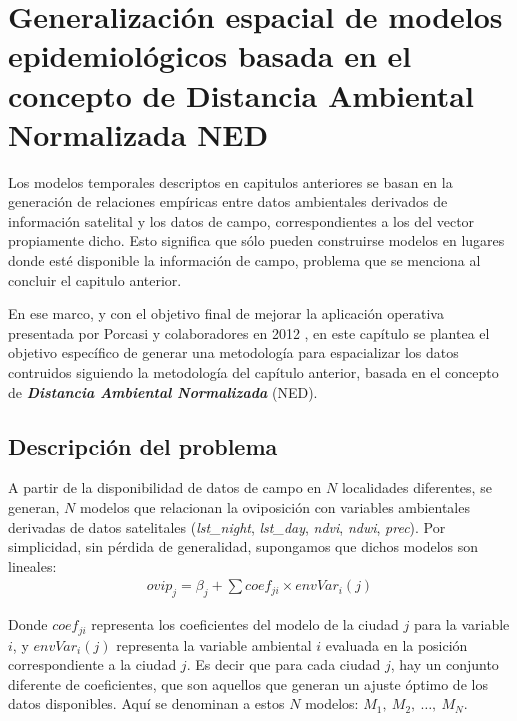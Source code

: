 %
%
%
%
\justifying

\chapter{Generalización espacial de modelos epidemiológicos basada en el
        concepto de Distancia Ambiental Normalizada NED}

  \par Los modelos temporales descriptos en capitulos anteriores se basan en la
    generación de relaciones empíricas entre datos ambientales derivados de
    información satelital y los datos de campo, correspondientes a los del vector
    propiamente dicho. Esto significa que sólo pueden construirse modelos en
    lugares donde esté disponible la información de campo, problema que se
    menciona al concluir el capitulo anterior.

  \par En ese marco, y con el objetivo final de mejorar la aplicación operativa
    presentada por Porcasi y colaboradores en 2012 \cite{porcasi_operative},
    en este capítulo se plantea el objetivo específico de generar
    una metodología para espacializar los datos contruidos siguiendo la
    metodología del capítulo anterior, basada en el concepto de
    \textbf{\textit{Distancia Ambiental Normalizada}} (NED).

\section{Descripción del problema}
  \par A partir de la disponibilidad de datos de campo en $N$ localidades
    diferentes, se generan,
    $N$ modelos que relacionan la oviposición con variables ambientales
    derivadas de datos satelitales (\textit{lst\_night}, \textit{lst\_day},
    \textit{ndvi}, \textit{ndwi}, \textit{prec}). Por simplicidad, sin pérdida
    de generalidad, supongamos que dichos modelos son lineales:
    \begin{align}
      ovip_{j} = \beta_{j} + \sum{}{coef_{ji} \times envVar_{i}(j)}
    \end{align}

  \par Donde $coef_{ji}$ representa los coeficientes del modelo de la
    ciudad $j$ para la variable $i$, y $envVar_{i}(j)$ representa la variable
    ambiental $i$ evaluada en la posición correspondiente a la ciudad $j$.
    Es decir que para cada ciudad $j$, hay un conjunto diferente de
    coeficientes, que son aquellos que generan un ajuste óptimo de los datos
    disponibles. Aquí se denominan a estos $N$ modelos: $M_{1},\ M_{2},\ \dots,\ M_{N}$.


